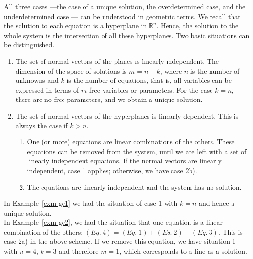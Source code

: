 \documentclass[
  a4paper,
  DIV=11,
  numbers=noendperiod,
  oneside]{scrreprt}
\theoremstyle{definition}
\theoremstyle{remark}
\begin{document}
\begin{tcolorbox}[enhanced jigsaw, opacitybacktitle=0.6, left=2mm, breakable, bottomrule=.15mm, colbacktitle=quarto-callout-note-color!10!white, leftrule=.75mm, titlerule=0mm, rightrule=.15mm, toprule=.15mm, colback=white, toptitle=1mm, colframe=quarto-callout-note-color-frame, coltitle=black, bottomtitle=1mm, title=\textcolor{quarto-callout-note-color}{\faInfo}\hspace{0.5em}{Additional material: Geometric interpretation}, opacityback=0, arc=.35mm]

All three cases ---the case of a unique solution, the overdetermined
case, and the underdetermined case --- can be understood in geometric
terms. We recall that the solution to each equation is a hyperplane in
\(\mathbb{R}^{n}\). Hence, the solution to the whole system is the
intersection of all these hyperplanes. Two basic situations can be
distinguished.

\begin{enumerate}
\def\labelenumi{\arabic{enumi}.}
\item
  The set of normal vectors of the planes is linearly independent. The
  dimension of the space of solutions is \(m=n-k\), where \(n\) is the
  number of unknowns and \(k\) is the number of equations, that is, all
  variables can be expressed in terms of \(m\) free variables or
  parameters. For the case \(k=n\), there are no free parameters, and we
  obtain a unique solution.
\item
  The set of normal vectors of the hyperplanes is linearly dependent.
  This is always the case if \(k>n\).

  \begin{enumerate}
  \def\labelenumii{(\alph{enumii})}
  \item
    One (or more) equations are linear combinations of the others. These
    equations can be removed from the system, until we are left with a
    set of linearly independent equations. If the normal vectors are
    linearly independent, case 1 applies; otherwise, we have case 2b).
  \item
    The equations are linearly independent and the system has no
    solution.
  \end{enumerate}
\end{enumerate}

In Example~\ref{exm-ge1} we had the situation of case 1 with \(k=n\) and
hence a unique solution.\\
In Example~\ref{exm-ge2}, we had the situation that one equation is a
linear combination of the others:
\((Eq.~4) = (Eq.~1)+(Eq.~2) - (Eq.~3)\). This is case 2a) in the above
scheme. If we remove this equation, we have situation 1 with \(n=4\),
\(k=3\) and therefore \(m=1\), which corresponds to a line as a
solution.


\end{tcolorbox}
\end{document}
